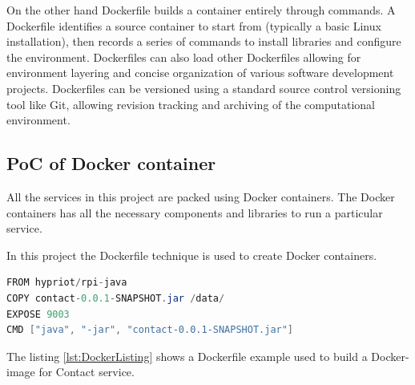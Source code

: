 On the other hand Dockerfile builds a container entirely through commands. A Dockerfile identifies a source container to start from (typically a basic Linux installation), then records a series of commands to install libraries and configure the environment. Dockerfiles can also load other Dockerfiles allowing for environment layering and concise organization of various software development projects. Dockerfiles can be versioned using a standard source control versioning tool like Git, allowing revision tracking and archiving of the computational environment.\\

\subsection{PoC of Docker container}
All the services in this project are packed using Docker containers. The Docker containers has all the necessary components and libraries to run a particular service. 

In this project the Dockerfile technique is used to create Docker containers. \cite{Docker2014}

\begin{lstlisting}[frame=single,caption={Dockerfile with command to be carried out},label={{lst:DockerListing}},language=Java]
FROM hypriot/rpi-java
COPY contact-0.0.1-SNAPSHOT.jar /data/
EXPOSE 9003
CMD ["java", "-jar", "contact-0.0.1-SNAPSHOT.jar"]
\end{lstlisting}

The listing \ref{lst:DockerListing} shows a Dockerfile example used to build a Docker-image for Contact service. %

%
%
%
%
%  
%

